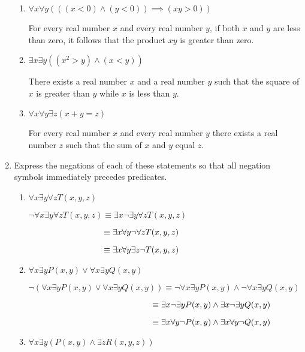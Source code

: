 \documentclass[11pt]{article}
\begin{document}
\begin{enumerate}[label=\textbf{\arabic*.}]
\begin{enumerate}[label=\textbf{\alph*)}]
		\item $\forall x\forall y(((x < 0) \land (y < 0)) \implies (xy > 0))$
		
		For every real number $x$ and every real number $y$, if both $x$ and $y$ are less than zero, it follows that the product $xy$ is greater than zero.
		
		\item $\exists x\exists y((x^2 > y) \land (x < y))$
		
		There exists a real number $x$ and a real number $y$ such that the square of $x$ is greater than $y$ while $x$ is less than $y$.
		
		\item $\forall x\forall y\exists z(x + y = z)$
		
		For every real number $x$ and every real number $y$ there exists a real number $z$ such that the sum of $x$ and $y$ equal $z$.
	\end{enumerate}

	\item Express the negations of each of these statements so that all negation symbols immediately precedes predicates.
	\begin{enumerate}[label=\textbf{\alph*)}]
		\item $\forall x\exists y\forall zT(x, y, z)$
		
		$\neg \forall x\exists y\forall zT(x, y, z) \equiv \exists x \neg \exists y\forall zT(x, y, z)$
		
		$\hspace{3.15cm}\equiv \exists x\forall y\neg \forall zT(x, y, z)$
		
		$\hspace{3.15cm}\equiv \exists x\forall y\exists z\neg T(x, y, z)$
		
		\item $\forall x\exists yP(x, y) \lor \forall x\exists yQ(x, y)$
		
		$\neg(\forall x\exists yP(x, y) \lor \forall x\exists yQ(x, y)) \equiv \neg\forall x\exists yP(x, y) \land \neg\forall x\exists yQ(x, y)$
		
		$\hspace{5.17cm}\equiv \exists x\neg\exists yP(x, y) \land \exists x\neg\exists yQ(x, y)$

		$\hspace{5.17cm}\equiv \exists x\forall y\neg P(x, y) \land \exists x\forall y\neg Q(x, y)$
		
		\item $\forall x\exists y(P(x, y) \land \exists zR(x, y, z))$
		

\end{enumerate}
\end{enumerate}
\end{document}
